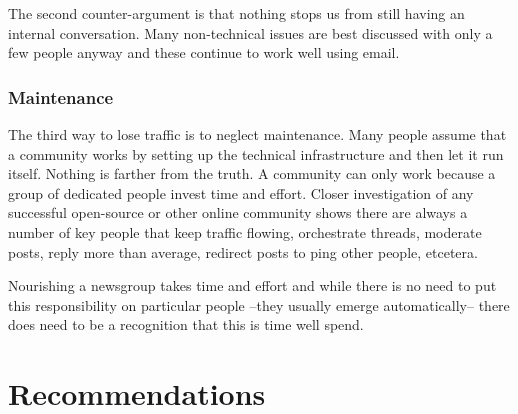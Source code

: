 \documentclass[twocolumn]{paper}
\begin{document}
The second counter-argument is that nothing stops us from still
having an internal conversation. Many non-technical issues are best
discussed with only a few people anyway and these continue to work
well using email.

\subsubsection{Maintenance}

The third way to lose traffic is to neglect maintenance. Many people
assume that a community works by setting up the technical
infrastructure and then let it run itself. Nothing is farther from
the truth. A community can only work because a group of dedicated
people invest time and effort. Closer investigation of any
successful open-source or other online community shows there are
always a number of key people that keep traffic flowing, orchestrate
threads, moderate posts, reply more than average, redirect posts to
ping other people, etcetera.

Nourishing a newsgroup takes time and effort and while there is no
need to put this responsibility on particular people --they usually
emerge automatically-- there does need to be a recognition that this
is time well spend.

\section{Recommendations}
\end{document}
